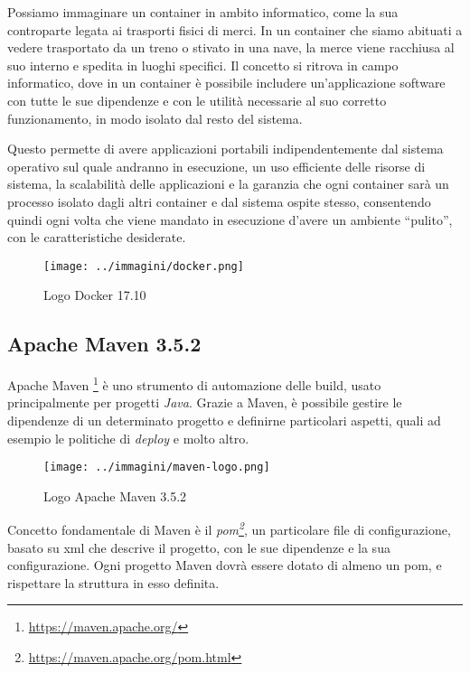 Possiamo immaginare un container in ambito informatico, come la sua controparte legata ai trasporti fisici di merci. In un container che siamo abituati a vedere trasportato da un treno o stivato in una nave, la merce viene racchiusa al suo interno e spedita in luoghi specifici. Il concetto si ritrova in campo informatico, dove in un container è possibile includere un'applicazione software con tutte le sue dipendenze e con le utilità necessarie al suo corretto funzionamento, in modo isolato dal resto del sistema. 

Questo permette di avere applicazioni portabili indipendentemente dal sistema operativo sul quale andranno in esecuzione, un uso efficiente delle risorse di sistema, la scalabilità delle applicazioni e la garanzia che ogni \gls{container} sarà un processo isolato dagli altri \gls{container} e dal sistema ospite stesso, consentendo quindi ogni volta che viene mandato in esecuzione d'avere un ambiente ``pulito'', con le caratteristiche desiderate. 

\begin{figure}[H]
    \capstart
    \centering
    \texttt{[image: ../immagini/docker.png]}
    \caption{Logo Docker 17.10}
\end{figure}

\subsection{Apache Maven 3.5.2}

Apache Maven \footnote{\url{https://maven.apache.org/}} è uno strumento di automazione delle \gls{build}, usato principalmente per progetti \textit{Java}. Grazie a Maven, è possibile gestire le dipendenze di un determinato progetto e definirne particolari aspetti, quali ad esempio le politiche di \textit{\gls{deploy}} e molto altro. \\

\begin{figure}[H]
    \capstart
    \centering
    \texttt{[image: ../immagini/maven-logo.png]}
    \caption{Logo Apache Maven 3.5.2}
\end{figure}

Concetto fondamentale di Maven è il \textit{\gls{pom}\footnote{\url{https://maven.apache.org/pom.html}}}, un particolare file di configurazione, basato su \gls{xml} che descrive il progetto, con le sue dipendenze e la sua configurazione. Ogni progetto Maven dovrà essere dotato di almeno un \gls{pom}, e rispettare la struttura in esso definita.

